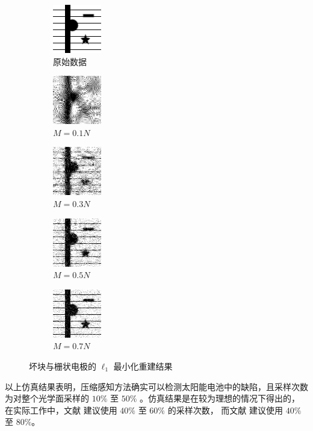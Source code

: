 \begin{figure}
\centering
\begin{subfigure}[t]{1.1in}
	\includegraphics{Figure/testdata/2dsharp_finger.png}
	\caption{原始数据}
\end{subfigure}
\begin{subfigure}[t]{1.1in}
	\includegraphics{Figure/L1/finger10.png}
	\caption{$M = 0.1 N$}
\end{subfigure}
\begin{subfigure}[t]{1.1in}
	\includegraphics{Figure/L1/finger30.png}
	\caption{$M = 0.3 N$}
\end{subfigure}
\begin{subfigure}[t]{1.1in}
	\includegraphics{Figure/L1/finger50.png}
	\caption{$M = 0.5 N$}
\end{subfigure}
\begin{subfigure}[t]{1.1in}
	\includegraphics{Figure/L1/finger70.png}
	\caption{$M = 0.7 N$}
\end{subfigure}
\caption{坏块与栅状电极的 $\ell_1$ 最小化重建结果}
\label{fig:L1finger}
\end{figure}

以上仿真结果表明，压缩感知方法确实可以检测太阳能电池中的缺陷，且采样次数
为对整个光学面采样的 $10\%$ 至 $50\%$ 。仿真结果是在较为理想的情况下得出的，
在实际工作中，文献 \cite{XDUCLBIC} 建议使用 $40\%$ 至 $60\%$ 的采样次数，
而文献 \cite{CLBIC17} 建议使用 $40\%$ 至 $80\%$。
